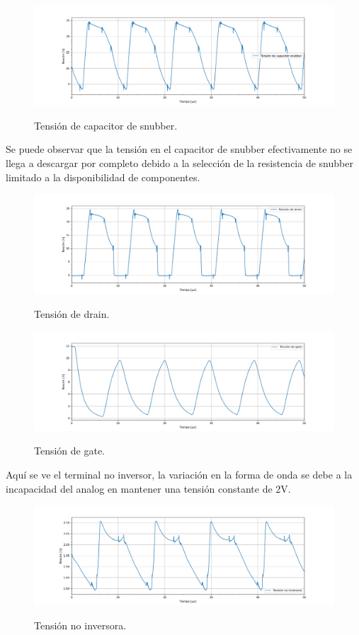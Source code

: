 \begin{figure}[H]
	\centering
	\includegraphics[width=0.9\linewidth]{ImagenesParteIV/Vcsnubber.png}
	\label{fig:vcsnubb_4}
	\caption{Tensión de capacitor de snubber.}
\end{figure}
Se puede observar que la tensión en el capacitor de snubber efectivamente no se llega a descargar por completo debido a la selección de la resistencia de snubber limitado a la disponibilidad de componentes.
\begin{figure}[H]
	\centering
	\includegraphics[width=0.9\linewidth]{ImagenesParteIV/Vds.png}
	\label{fig:vds_4}
	\caption{Tensión de drain.}
\end{figure}

\begin{figure}[H]
	\centering
	\includegraphics[width=0.9\linewidth]{ImagenesParteIV/Vgs.png}
	\label{fig:vgs_4}
	\caption{Tensión de gate.}
\end{figure}
Aquí se ve el terminal no inversor, la variación en la forma de onda se debe a la incapacidad del analog en mantener una tensión constante de 2V.
\begin{figure}[H]
	\centering	\includegraphics[width=0.9\linewidth]{ImagenesParteIV/Vni.png}
	\label{fig:vni_4}
	\caption{Tensión no inversora.}
\end{figure}

